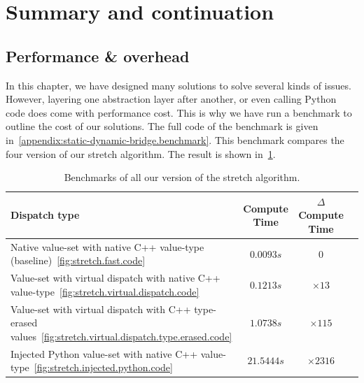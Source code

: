 \section{Summary and continuation}

\subsection{Performance \& overhead}

In this chapter, we have designed many solutions to solve several kinds of issues. However, layering one abstraction
layer after another, or even calling Python code does come with performance cost. This is why we have run a benchmark to
outline the cost of our solutions. The full code of the benchmark is given
in~\cref{appendix:static-dynamic-bridge.benchmark}. This benchmark compares the four version of our stretch algorithm.
The result is shown in~\cref{table:static.dynamic.perfs}.

\begin{table}[htbp]
  \footnotesize
  \centering
  \begin{tabular}{l|ccc}
    \toprule
    Dispatch type                                                                                                   &
    Compute Time                                                                                                    &
    \(\Delta{}\)Compute Time
    \\ \midrule Native value-set with native C++ value-type (baseline)~\ref{fig:stretch.fast.code}
                                                                                                                    & \(0.0093s\) & \(0\) \\
    Value-set with virtual dispatch with native C++ value-type~\ref{fig:stretch.virtual.dispatch.code}              &
    \(0.1213s\)                                                                                                     &
    \(\times 13\)
    \\
    Value-set with virtual dispatch with C++ type-erased values~\ref{fig:stretch.virtual.dispatch.type.erased.code} &
    \(1.0738s\)                                                                                                     &
    \(\times 115\)
    \\
    Injected Python value-set with native C++ value-type~\ref{fig:stretch.injected.python.code}                     &
    \(21.5444s\)                                                                                                    &
    \(\times 2316\)
    \\
    \bottomrule
  \end{tabular}
  \caption{Benchmarks of all our version of the stretch algorithm.}
  \label{table:static.dynamic.perfs}
\end{table}

